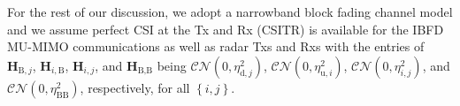 \documentclass[9pt,journal]{IEEEtran}
\newcommand{\paren}[1]{\left({#1}\right)}
\newcommand{\bracket}[1]{{\left [{#1}\right ]}}
\newcommand{\braces}[1]{{\left\{ {#1}\right\}}}
\newcommand{\B}{\textrm{B}}
\newcommand{\dui}{\mathbf{d}_{\textrm{u},i}\bracket{k,l}}
\newcommand{\PiB}{\mathbf{P}_{\textrm{u},i}\bracket{k}}
\newcommand{\PiBH}{\mathbf{P}^\dagger_{\textrm{u},i}\bracket{k}}
\newcommand{\PBj}{\mathbf{P}_{\textrm{d},j}\bracket{k}}
\newcommand{\PBjH}{\mathbf{P}^\dagger_{\textrm{d},j}\bracket{k}}
\newcommand{\PBg}{\mathbf{P}_{\textrm{d},g}\bracket{k}}
\newcommand{\PBgH}{\mathbf{P}^\dagger_{\textrm{d},g}\bracket{k}}
\newcommand{\HiB}{\mathbf{H}_{i,\textrm{B}}}
\newcommand{\HiBH}{\mathbf{H}^\dagger_{i,\textrm{B}}}
\theoremstyle{definition}
\begin{document}
For the rest of our discussion, we adopt a narrowband block fading channel model \cite{mishra2019toward} and we assume perfect CSI at the Tx and Rx (CSITR) is available for the IBFD MU-MIMO communications as well as radar Txs and Rxs with the entries of $\mathbf{H}_{\textrm{B},j}$, $\mathbf{H}_{i,\textrm{B}}$, $\mathbf{H}_{i,j}$, and $\mathbf{H}_{\textrm{B,B}}$ being $\mathcal{CN}\paren{0,\eta^2_{\textrm{d},j}}$, $\mathcal{CN}\paren{0,\eta^2_{\textrm{u},i}}$, $\mathcal{CN}\paren{0,\eta^2_{i,j}}$, and $\mathcal{CN}\paren{0,\eta^2_{\textrm{BB}}}$, respectively, for all $\braces{i,j}$.

\end{document}
